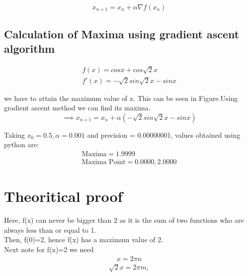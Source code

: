 \documentclass[10pt,a4paper]{report}
\begin{document}
\begin{multicols}{2}
\begin{equation}
        x_{n+1} = x_n + \alpha \nabla f(x_n) 
\end{equation}
\begin{flushleft}
\subsection*{Calculation of Maxima using gradient ascent algorithm}
\end{flushleft}
\begin{align}
f(x) = cosx+cos\sqrt{2}x\\
f'(x) = -\sqrt{2} sin\sqrt{2}x-sinx
\end{align}

\vspace{1mm}
we have to attain the maximum value of x. This can be seen in Figure.Using gradient ascent method we can find its maxima.
\begin{equation}
\implies x_{n+1}=x_n+\alpha(-\sqrt{2} sin\sqrt{2}x-sinx)
\end{equation}

Taking $x_0=0.5,\alpha=0.001$ and precision = 0.00000001, values obtained using python are:
    \begin{align}
        \boxed{\text{Maxima} =1.9999}\\     
        \boxed{\text{Maxima Point} =0.0000,2.0000 }
    \end{align}
    \section*{Theoritical proof}
  Here, f(x) can never be bigger than 2 as it is the sum of two functions who are always less than or equal to 1.
\vspace{0.25cm}\\  
  Then, f(0)=2, hence f(x) has a maximum value of 2. 
  \vspace{0.25cm}\\
  Next note for f(x)=2 we need 
  \begin{align}
  x=2\pi n
  \end{align}
   \begin{align}
   \sqrt{2}x=2\pi m, 
   \end{align}
    

\end{multicols}
\end{document}
